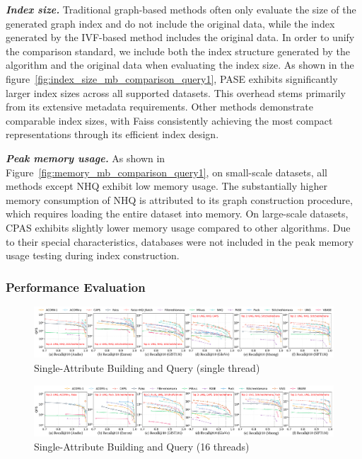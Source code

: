 \documentclass[sigconf, nonacm]{acmart}
\begin{document}
\begin{sloppypar}
\vspace{0.5em}
\textit{\textbf{Index size.}}
Traditional graph-based methods often only evaluate the size of the generated graph index and do not include the original data, while the index generated by the IVF-based method includes the original data. In order to unify the comparison standard, we include both the index structure generated by the algorithm and the original data when evaluating the index size. As shown in the figure~\ref{fig:index_size_mb_comparison_query1}, PASE exhibits significantly larger index sizes across all supported datasets. This overhead stems primarily from its extensive metadata requirements. Other methods demonstrate comparable index sizes, with Faiss consistently achieving the most compact representations through its efficient index design.

\vspace{0.5em}
\textit{\textbf{Peak memory usage.}}
As shown in Figure~\ref{fig:memory_mb_comparison_query1}, on small-scale datasets, all methods except NHQ exhibit low memory usage. The substantially higher memory consumption of NHQ is attributed to its graph construction procedure, which requires loading the entire dataset into memory. On large-scale datasets, CPAS exhibits slightly lower memory usage compared to other algorithms. Due to their special characteristics, databases were not included in the peak memory usage testing during index construction.



\subsubsection{Performance Evaluation}



\begin{figure}
    \centering
        \setlength{\abovecaptionskip}{0cm}
    \setlength{\belowcaptionskip}{-0.4cm}
    \includegraphics[width=\textwidth]{figures/exp/exp_1_1_SingleLabel_1thread.pdf}
    \caption{Single-Attribute Building and Query (single thread) }
    \label{fig:exp_1_1_SingleLabel_1thread}
\end{figure}

\begin{figure}
    \centering
    \setlength{\abovecaptionskip}{0cm}
    \setlength{\belowcaptionskip}{-0.4cm}
    \includegraphics[width=\textwidth]{figures/exp/exp_1_2_SingleLabel_16thread.pdf}
    \caption{Single-Attribute Building and Query (16 threads)}
    \label{fig:exp_1_2_SingleLabel_16thread}
\end{figure}


\end{sloppypar}
\end{document}
